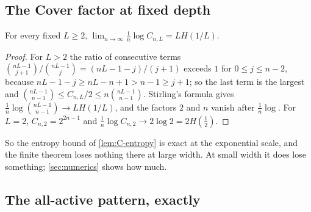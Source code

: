 \subsection{The Cover factor at fixed depth}

\begin{lemma}\label{lem:C-rate}
For every fixed $L\ge2$, $\lim_{n\to\infty}\frac1n\log C_{n,L}=LH(1/L)$.
\end{lemma}

\begin{proof}
For $L>2$ the ratio of consecutive terms $\binom{nL-1}{j+1}/\binom{nL-1}{j}=(nL-1-j)/(j+1)$ exceeds $1$ for $0\le j\le n-2$, because $nL-1-j\ge nL-n+1>n-1\ge j+1$; so the last term is the largest and $\binom{nL-1}{n-1}\le C_{n,L}/2\le n\binom{nL-1}{n-1}$. Stirling's formula gives $\frac1n\log\binom{nL-1}{n-1}\to LH(1/L)$, and the factors $2$ and $n$ vanish after $\frac1n\log$. For $L=2$, $C_{n,2}=2^{2n-1}$ and $\frac1n\log C_{n,2}\to2\log2=2H(\tfrac12)$.
\end{proof}

So the entropy bound of \cref{lem:C-entropy} is exact at the exponential scale, and the finite theorem loses nothing there at large width. At small width it does lose something; \cref{sec:numerics} shows how much.

\subsection{The all-active pattern, exactly}

